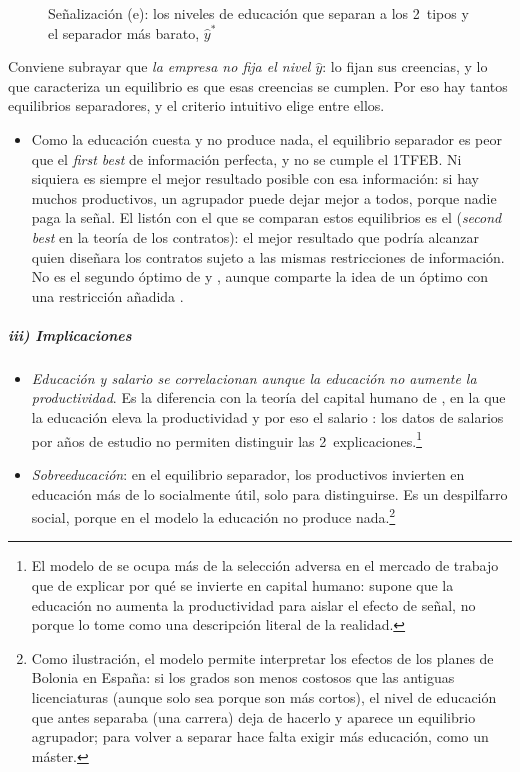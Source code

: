 \documentclass[11pt]{article}
\begin{document}
\begin{figure}[H]
\centering
\caption{Señalización (e): los niveles de educación que separan a los 2~tipos y el separador más barato, $\hat y^*$}\label{fig:spence}
\end{figure}

\begin{notaopositor}
Conviene subrayar que \emph{la empresa no fija el nivel $\hat y$}: lo fijan sus creencias, y lo que caracteriza un equilibrio es que esas creencias se cumplen. Por eso hay tantos equilibrios separadores, y el criterio intuitivo elige entre ellos.
\end{notaopositor}

\begin{itemize}
\item Como la educación cuesta y no produce nada, el equilibrio separador es peor que el \emph{first best} de información perfecta, y no se cumple el 1TFEB. Ni siquiera es siempre el mejor resultado posible con esa información: si hay muchos productivos, un agrupador puede dejar mejor a todos, porque nadie paga la señal. El listón con el que se comparan estos equilibrios es el  (\emph{second best} en la teoría de los contratos): el mejor resultado que podría alcanzar quien diseñara los contratos sujeto a las mismas restricciones de información. No es el segundo óptimo de  y , aunque comparte la idea de un óptimo con una restricción añadida .
\end{itemize}

\subparagraph{iii) Implicaciones}

\begin{itemize}
\item \emph{Educación y salario se correlacionan aunque la educación no aumente la productividad}. Es la diferencia con la teoría del capital humano de , en la que la educación eleva la productividad y por eso el salario : los datos de salarios por años de estudio no permiten distinguir las 2~explicaciones.\footnote{El modelo de  se ocupa más de la selección adversa en el mercado de trabajo que de explicar por qué se invierte en capital humano: supone que la educación no aumenta la productividad para aislar el efecto de señal, no porque lo tome como una descripción literal de la realidad.}
\item \emph{Sobreeducación}: en el equilibrio separador, los productivos invierten en educación más de lo socialmente útil, solo para distinguirse. Es un despilfarro social, porque en el modelo la educación no produce nada.\footnote{Como ilustración, el modelo permite interpretar los efectos de los planes de Bolonia en España: si los grados son menos costosos que las antiguas licenciaturas (aunque solo sea porque son más cortos), el nivel de educación que antes separaba (una carrera) deja de hacerlo y aparece un equilibrio agrupador; para volver a separar hace falta exigir más educación, como un máster.}
\end{itemize}
\end{document}
